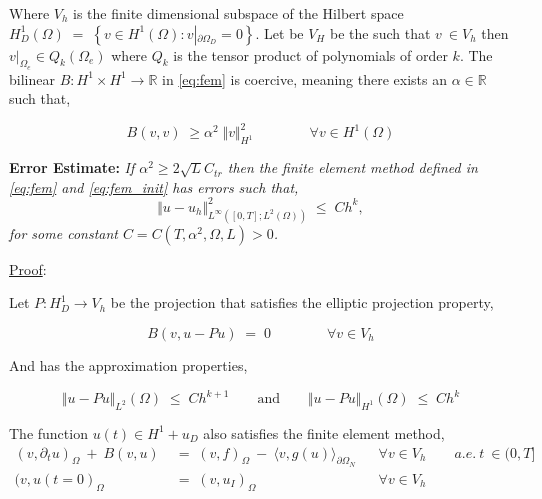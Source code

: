 \documentclass[10pt]{report}
\numberwithin{equation}{section}
\begin{document}
Where $V_{h}$ is the finite dimensional subspace of the Hilbert space $H_{D}^{1}(\Omega) \; = \; \left\{ v \in H^{1}(\Omega) : v \left\vert_{\partial \Omega_{D}} \right.  =  0 \right\}$.  Let be $V_{H}$ be the such that $v \ \in V_{h}$ then $v \vert_{\Omega_{e}} \in Q_{k}(\Omega_{e})$ where $Q_{k}$ is the tensor product of polynomials of order $k$. The bilinear $B : H^{1} \times H^{1} \rightarrow \mathbb{R}$ in \eqref{eq:fem} is coercive, meaning there exists an $\alpha \in \mathbb{R}$ such that,


\begin{equation}
B(v,v) \; \geq \alpha^{2} \; \Vert v \Vert_{H^{1}}^{2} \qquad \qquad \forall v \in H^{1}(\Omega)
\end{equation}

\bigskip


\textbf{Error Estimate:}
\textit{
If $\alpha^{2} \geq 2 \sqrt{L} C_{tr}$ then the finite element method defined in \eqref{eq:fem} and \eqref{eq:fem_init} has errors such that,}
\begin{equation}
\Vert u - u_{h} \Vert^{2}_{L^{\infty}\left([0,T]; L^{2}(\Omega)\right)}  \; \leq \; Ch^{k},
\end{equation}
\textit{for some constant $C = C(T,\alpha^{2},\Omega,L) > 0$.}

\medskip


\underline{Proof}:



Let $P: H^{1}_{D} \rightarrow V_{h}$ be the projection that satisfies the elliptic projection property,

\begin{equation}
B(v,u - Pu) \; = \; 0 \qquad \qquad \forall v \in V_{h}
\end{equation}


And has the approximation properties,

\begin{equation}
\Vert u - Pu \Vert_{L^{2}}(\Omega) \; \leq \; Ch^{k+1}  \qquad \text{and} \qquad 
\Vert u - Pu \Vert_{H^{1}}(\Omega) \; \leq \; Ch^{k} \label{eq:ApproxProp}
\end{equation}



The function $u(t) \in H^{1} + u_{D}$ also satisfies the finite element method, 
\begin{align}
(v,\partial_{t} u)_{\Omega} \ + \ B(v,u) \; &= \; (v,f)_{\Omega} \ - \ \langle v, g(u) \rangle_{\partial \Omega_{N}} && \forall v \in V_{h} \qquad a.e. \ t \ \in (0,T] \label{eq:weak} \\
(v,u(t=0)_{\Omega} \; &= \; (v,u_{I})_{\Omega} && \forall v \in V_{h} \label{eq:weak_init}
\end{align}
\end{document}
